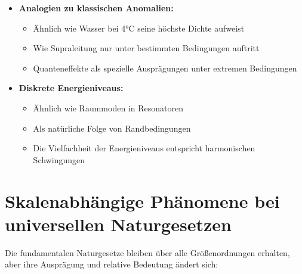 \documentclass[12pt,a4paper]{article}
\begin{document}
\begin{itemize}
    \item \textbf{Analogien zu klassischen Anomalien:}
    \begin{itemize}
        \item Ähnlich wie Wasser bei 4°C seine höchste Dichte aufweist
        \item Wie Supraleitung nur unter bestimmten Bedingungen auftritt
        \item Quanteneffekte als spezielle Ausprägungen unter extremen Bedingungen
    \end{itemize}

    \item \textbf{Diskrete Energieniveaus:}
    \begin{itemize}
        \item Ähnlich wie Raummoden in Resonatoren
        \item Als natürliche Folge von Randbedingungen
        \item Die Vielfachheit der Energieniveaus entspricht harmonischen Schwingungen
    \end{itemize}
\end{itemize}

\section{Skalenabhängige Phänomene bei universellen Naturgesetzen}

Die fundamentalen Naturgesetze bleiben über alle Größenordnungen erhalten, aber ihre Ausprägung und relative Bedeutung ändert sich:
\end{document}
